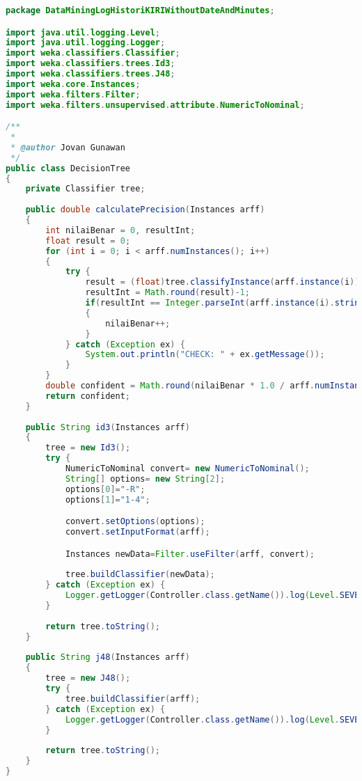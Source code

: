 \begin{lstlisting}[language=Java,basicstyle=\tiny,caption=DecisionTree.java]
package DataMiningLogHistoriKIRIWithoutDateAndMinutes;

import java.util.logging.Level;
import java.util.logging.Logger;
import weka.classifiers.Classifier;
import weka.classifiers.trees.Id3;
import weka.classifiers.trees.J48;
import weka.core.Instances;
import weka.filters.Filter;
import weka.filters.unsupervised.attribute.NumericToNominal;

/**
 *
 * @author Jovan Gunawan
 */
public class DecisionTree 
{
    private Classifier tree;
    
    public double calculatePrecision(Instances arff)
    {
        int nilaiBenar = 0, resultInt;
        float result = 0;
        for (int i = 0; i < arff.numInstances(); i++)
        {    
            try {
                result = (float)tree.classifyInstance(arff.instance(i));
                resultInt = Math.round(result)-1;
                if(resultInt == Integer.parseInt(arff.instance(i).stringValue(4)))
                {
                    nilaiBenar++;
                }
            } catch (Exception ex) {
                System.out.println("CHECK: " + ex.getMessage());
            }
        }
        double confident = Math.round(nilaiBenar * 1.0 / arff.numInstances() * 10000)/100.0;
        return confident;
    }
    
    public String id3(Instances arff)
    {
        tree = new Id3();
        try {
            NumericToNominal convert= new NumericToNominal();
            String[] options= new String[2];
            options[0]="-R";
            options[1]="1-4"; 

            convert.setOptions(options);
            convert.setInputFormat(arff);

            Instances newData=Filter.useFilter(arff, convert);
            
            tree.buildClassifier(newData);
        } catch (Exception ex) {
            Logger.getLogger(Controller.class.getName()).log(Level.SEVERE, null, ex);
        }
        
        return tree.toString();
    }
    
    public String j48(Instances arff)
    {
        tree = new J48();
        try {
            tree.buildClassifier(arff);
        } catch (Exception ex) {
            Logger.getLogger(Controller.class.getName()).log(Level.SEVERE, null, ex);
        }
        
        return tree.toString();
    }
}
\end{lstlisting}

